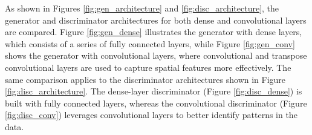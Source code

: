 As shown in Figures \ref{fig:gen_architecture} and \ref{fig:disc_architecture}, the generator and discriminator architectures for both dense and convolutional layers are compared. Figure \ref{fig:gen_dense} illustrates the generator with dense layers, which consists of a series of fully connected layers, while Figure \ref{fig:gen_conv} shows the generator with convolutional layers, where convolutional and transpose convolutional layers are used to capture spatial features more effectively. The same comparison applies to the discriminator architectures shown in Figure \ref{fig:disc_architecture}. The dense-layer discriminator (Figure \ref{fig:disc_dense}) is built with fully connected layers, whereas the convolutional discriminator (Figure \ref{fig:disc_conv}) leverages convolutional layers to better identify patterns in the data.

